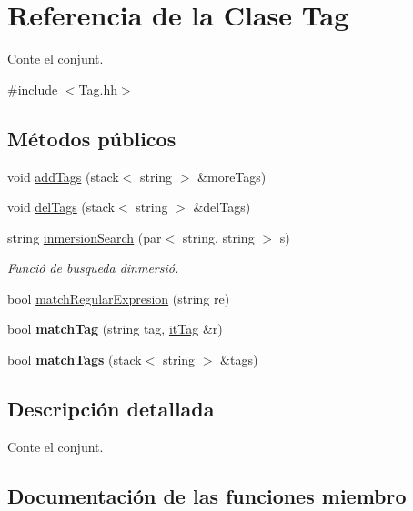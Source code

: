 \hypertarget{class_tag}{}\section{Referencia de la Clase Tag}
\label{class_tag}


Conte el conjunt.  




{\ttfamily \#include $<$Tag.\+hh$>$}

\subsection*{Métodos públicos}
\begin{DoxyCompactItemize}
\item 
void \hyperlink{class_tag_aab71459633317b1a082a81f8c624247d}{add\+Tags} (stack$<$ string $>$ \&more\+Tags)
\item 
void \hyperlink{class_tag_aa51960a077ff0607087ea34500929450}{del\+Tags} (stack$<$ string $>$ \&del\+Tags)
\item 
string \hyperlink{class_tag_aa8cbb5b634ef4ef4f88ab9effd7e51ba}{inmersion\+Search} (par$<$ string, string $>$ s)
\begin{DoxyCompactList}\small\item\em Funció de busqueda d\textquotesingle{}inmersió. \end{DoxyCompactList}\item 
bool \hyperlink{class_tag_afe9f536d194f4ae82a61f605cfd5b3b3}{match\+Regular\+Expresion} (string re)
\item 
\hypertarget{class_tag_ae2b54f8096632f04635140b36e808821}{}bool {\bfseries match\+Tag} (string tag, \hyperlink{_tag_8cc_aa1ffaea98934d2496035b29e4bee1786}{it\+Tag} \&r)\label{class_tag_ae2b54f8096632f04635140b36e808821}

\item 
\hypertarget{class_tag_abd2e470058c7f10cb56a4eb392311d20}{}bool {\bfseries match\+Tags} (stack$<$ string $>$ \&tags)\label{class_tag_abd2e470058c7f10cb56a4eb392311d20}

\end{DoxyCompactItemize}


\subsection{Descripción detallada}
Conte el conjunt. 

\subsection{Documentación de las funciones miembro}
\hypertarget{class_tag_aab71459633317b1a082a81f8c624247d}{}
